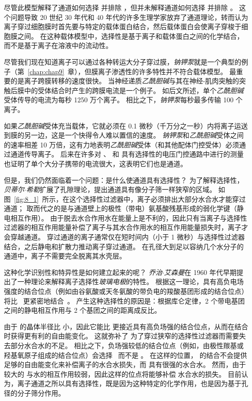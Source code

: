 尽管此模型解释了通道如何选择  并排除 ，但并未解释通道如何选择  并排除 。
这个问题导致 20 世纪 30 年代和 40 年代的许多生理学家放弃了通道理论，转而认为离子穿过细胞膜时首先要与特定的载体蛋白结合，然后载体蛋白会使离子穿梭于细胞膜之间。
在这种载体模型中，选择性是基于离子和载体蛋白之间的化学结合，而不是基于离子在溶液中的流动性。


尽管我们现在知道离子可以通过各种转运大分子穿过膜，\textit{钠钾泵}就是一个典型的例子（第~\ref{chap:chap9}~章），但膜离子渗透性的许多特性并不符合载体模型。
最重要的是离子跨膜转移的速度很快。 
当神经递质\textit{乙酰胆碱}与其在神经-肌肉突触的突触后膜中的受体结合时产生的跨膜电流是一个例子。
如后文所述，单个\textit{乙酰胆碱}受体传导的电流为每秒 1250 万个离子。
相比之下，\textit{钠钾泵}每秒最多传输 100 个离子。


如果\textit{乙酰胆碱}受体充当载体，它就必须在 0.1 微秒（千万分之一秒）内将离子运送到膜的另一边，这是一个快得令人难以置信的速度。
\textit{钠钾泵}和\textit{乙酰胆碱}受体之间的速率相差 10 万倍，这有力地表明\textit{乙酰胆碱}受体（和其他配体门控受体）必须通过通道传导离子。
后来在许多对 、 和  具有选择性的电压门控通路中进行的测量也证明了单个大分子携带的电流很大，这表明它们也是通道。


但是，我们仍然面临着一个问题：是什么使通道具有选择性？
为了解释选择性，\textit{贝蒂尔$\cdot$希勒}扩展了孔隙理论，提出通道具有像分子筛一样狭窄的区域。
如图~\ref{fig:8_1}~所示，在这个选择性过滤器中，离子必须排出大部分水合水才能穿过通道；
取而代之的是与通道壁上的极性（带电）氨基酸残基形成的弱化学键（静电相互作用）。
由于脱去水合作用水在能量上是不利的，因此只有当离子与选择性过滤器的相互作用能量补偿了离子与其水合作用水的相互作用能量损失时，离子才会穿越通道。
穿过通道的离子通常仅在短时间内（小于 1 微秒）与选择性过滤器结合，之后静电和扩散力推动离子穿过通道。
在孔径大到足以容纳几个水分子的通道中，离子不需要完全脱离其水壳层。


这种化学识别性和特异性是如何建立起来的呢？
\textit{乔治$\cdot$艾森曼}在 1960 年代早期提出了一种理论来解释离子选择性\textit{玻璃电极}的特性。
根据这一理论，具有高负电场强度的结合位点（例如由谷氨酸或天冬氨酸的带负电的羧酸基团形成的结合位点）将比~ 更紧密地结合~。
产生这种选择性的原因是：根据库仑定律，2 个带电基团之间的静电相互作用与 2 个基团之间的距离成反比。


由于  的晶体半径比  小，因此它能比  更接近具有高负场强的结合位点，从而在结合时获得更有利的自由能变化。
这就弥补了  为了穿过狭窄的选择性过滤器而需要失去部分水合水的不足。
相比之下，负场强较低的结合位点（例如，由极性羰基或羟基氧原子组成的结合位点）会选择~ 而不是 。
在这样的位置， 的结合不会提供足够的自由能变化来补偿离子的水合水损失，而  具有很强的水合水。
然而，由于较大的  与水的相互作用较弱，因此这样的位点将能够补偿  水合水的损失。
目前认为，离子通道之所以具有选择性，既是因为这种特定的化学作用，也是因为基于孔径的分子筛分作用。



